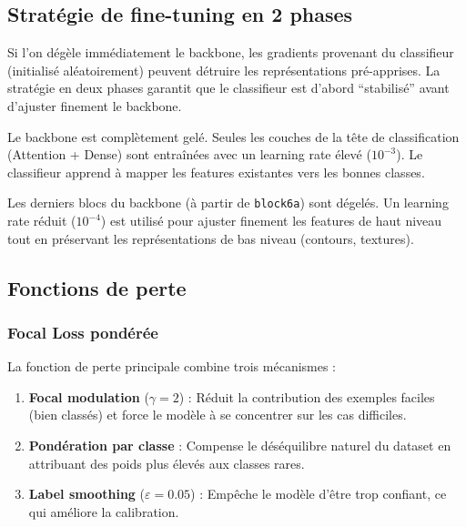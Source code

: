﻿\documentclass[11pt,a4paper]{article}
\begin{document}
\subsection{Stratégie de fine-tuning en 2 phases}

\begin{warnbox}
Si l'on dégèle immédiatement le backbone, les gradients provenant du classifieur (initialisé aléatoirement) peuvent détruire les représentations pré-apprises. La stratégie en deux phases garantit que le classifieur est d'abord ``stabilisé'' avant d'ajuster finement le backbone.
\end{warnbox}

\begin{description}[leftmargin=2em]
  \item[Phase 1 -- Warmup (5 epochs)] Le backbone est complètement gelé. Seules les couches de la tête de classification (Attention + Dense) sont entraînées avec un learning rate élevé ($10^{-3}$). Le classifieur apprend à mapper les features existantes vers les bonnes classes.

  \item[Phase 2 -- Fine-tuning (30 epochs)] Les derniers blocs du backbone (à partir de \texttt{block6a}) sont dégelés. Un learning rate réduit ($10^{-4}$) est utilisé pour ajuster finement les features de haut niveau tout en préservant les représentations de bas niveau (contours, textures).
\end{description}

\subsection{Fonctions de perte}

\subsubsection{Focal Loss pondérée}

La fonction de perte principale combine trois mécanismes :

\begin{enumerate}[leftmargin=2em]
  \item \textbf{Focal modulation} ($\gamma = 2$) : Réduit la contribution des exemples faciles (bien classés) et force le modèle à se concentrer sur les cas difficiles.
  \item \textbf{Pondération par classe} : Compense le déséquilibre naturel du dataset en attribuant des poids plus élevés aux classes rares.
  \item \textbf{Label smoothing} ($\varepsilon = 0.05$) : Empêche le modèle d'être trop confiant, ce qui améliore la calibration.
\end{enumerate}
\end{document}
